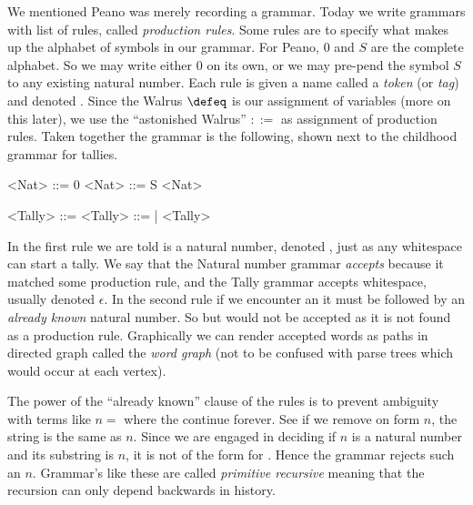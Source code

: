 We mentioned Peano was merely recording a grammar.  Today we write grammars with
list of rules, called \emph{production rules}.  Some rules are to specify what
makes up the alphabet of symbols in our grammar.  For Peano, $0$ and $S$ are the
complete alphabet.  So we may write either $0$ on its own, or we may pre-pend
the symbol $S$ to any existing natural number.  Each rule is given a name called
a \emph{token} (or \emph{tag}) and denoted . Since the Walrus
$\defeq$ is our assignment of variables (more on this later), we use the
``astonished Walrus'' $::=$ as assignment of production rules.   Taken together
the grammar is the following, shown next to the childhood grammar for tallies.
\begin{center}
\begin{minipage}{0.4\textwidth}
\begin{gcode}[]
<Nat> ::= 0 
<Nat> ::= S <Nat>
\end{gcode}
\end{minipage}
\hfill
\begin{minipage}{0.45\textwidth}
\begin{gcode}[]
<Tally> ::=  
<Tally> ::= | <Tally>
\end{gcode}
\end{minipage}
\end{center}
In the first rule we are told  is a natural number, denoted
, just as any whitespace can start a tally. We say that the Natural
number grammar \emph{accepts}  because it matched some production rule,
and the Tally grammar accepts whitespace, usually denoted $\epsilon$.  In the
second rule if we encounter an  it must be followed by an \emph{already
known} natural number.  So  but  would not be accepted as
it is not found as a production rule.  Graphically we can render accepted words
as paths in directed graph called the \emph{word graph} (not to be confused with
parse trees which would occur at each vertex).
\begin{center}
\end{center}
The power of the ``already known'' clause of the rules is to prevent ambiguity 
with terms like $n=$ where the  continue forever.
See if we remove on  form $n$, the string is the same as $n$.
Since we are engaged in deciding if $n$ is a natural number and its substring 
is $n$, it is not of the form  for .  Hence the grammar 
rejects such an $n$.  Grammar's like these are called \emph{primitive recursive}
meaning that the recursion can only depend backwards 
in history.

